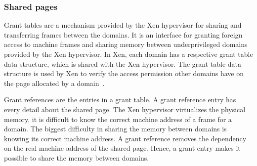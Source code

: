 \subsubsection*{Shared pages}
\label{subsec:sharedpages}
Grant tables are a mechanism provided by the Xen hypervisor for sharing and transferring frames between the domains. It is an interface for granting foreign access to machine frames and sharing memory between underprivileged domains provided by the Xen hypervisor. In Xen, each domain has a respective grant table data structure, which is shared with the Xen hypervisor. The grant table data structure is used by Xen to verify the access permission other domains have on the page allocated by a domain~\cite{granttable}.

Grant references are the entries in a grant table. A grant reference entry has every detail about the shared page. The Xen hypervisor virtualizes the physical memory, it is difficult to know the correct machine address of a frame for a domain. The biggest difficulty in sharing the memory between domains is knowing its correct machine address. A grant reference removes the dependency on the real machine address of the shared page. Hence, a grant entry makes it possible to share the memory between domains.\cite{Chisnall:2007:DGX:1407351, Barham:2003:XAV:945445.945462, granttable} 

